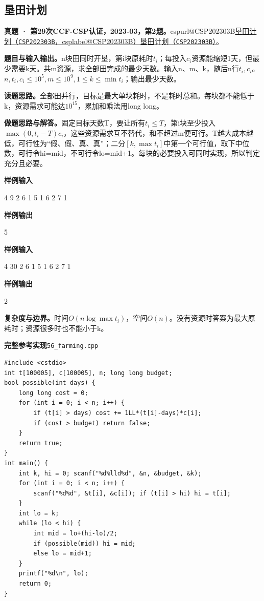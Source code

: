 \documentclass[UTF8,11pt,a4paper,fontset=none]{ctexart}
\makeatletter
\newcommand{\csp}[2]{\ifcsname cspurl@#1\endcsname\href{\csname cspurl@#1\endcsname}{#2（\texttt{#1}，\csname csplabel@#1\endcsname）}\else\href{https://oj.shumeng.tech/p/#1}{#2（\texttt{#1}）}\fi}
\makeatother
\begin{document}
\subsection{垦田计划}
\textbf{真题 · 第29次CCF-CSP认证，2023-03，第2题。}\csp{CSP202303B}{垦田计划}。

\noindent\textbf{题目与输入输出。}n块田同时开垦，第i块原耗时$t_i$；每投入$c_i$资源能缩短1天，但最少需要k天。共m资源，求全部田完成的最少天数。输入n、m、k，随后n行$t_i,c_i$。$n,t_i,c_i\le10^5,m\le10^9,1\le k\le\min t_i$；输出最少天数。

\noindent\textbf{读题思路。}全部田并行，目标是最大单块耗时，不是耗时总和。每块都不能低于k，资源需求可能达$10^{15}$，累加和乘法用long long。

\noindent\textbf{做题思路与解答。}固定目标天数T，要让所有$t_i\le T$，第i块至少投入$\max(0,t_i-T)c_i$，这些资源需求互不替代，和不超过m便可行。T越大成本越低，可行性为“假、假、真、真”；二分$[k,\max t_i]$中第一个可行值，取下中位数，可行令hi=mid，不可行令lo=mid+1。每块的必要投入可同时实现，所以判定充分且必要。
\begin{tcolorbox}[samplebox,title={输入输出样例}]
\textbf{样例输入}
\begin{Sample}
4 9 2
6 1
5 1
6 2
7 1
\end{Sample}
\tcblower
\textbf{样例输出}
\begin{Sample}
5
\end{Sample}
\end{tcolorbox}
\begin{tcolorbox}[samplebox,title={输入输出样例}]
\textbf{样例输入}
\begin{Sample}
4 30 2
6 1
5 1
6 2
7 1
\end{Sample}
\tcblower
\textbf{样例输出}
\begin{Sample}
2
\end{Sample}
\end{tcolorbox}

\noindent\textbf{复杂度与边界。}时间$O(n\log\max t_i)$，空间$O(n)$。没有资源时答案为最大原耗时；资源很多时也不能小于k。
\par\noindent\begin{minipage}{\linewidth}
\textbf{完整参考实现}\quad\texttt{56\_farming.cpp}
\begin{lstlisting}
#include <cstdio>
int t[100005], c[100005], n; long long budget;
bool possible(int days) {
    long long cost = 0;
    for (int i = 0; i < n; i++) {
        if (t[i] > days) cost += 1LL*(t[i]-days)*c[i];
        if (cost > budget) return false;
    }
    return true;
}
int main() {
    int k, hi = 0; scanf("%d%lld%d", &n, &budget, &k);
    for (int i = 0; i < n; i++) {
        scanf("%d%d", &t[i], &c[i]); if (t[i] > hi) hi = t[i];
    }
    int lo = k;
    while (lo < hi) {
        int mid = lo+(hi-lo)/2;
        if (possible(mid)) hi = mid;
        else lo = mid+1;
    }
    printf("%d\n", lo);
    return 0;
}
\end{lstlisting}
\end{minipage}\par
\end{document}
